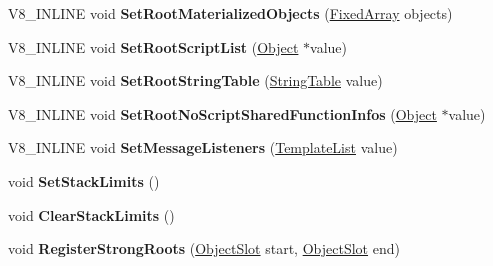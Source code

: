 \begin{DoxyCompactItemize}
V8\+\_\+\+I\+N\+L\+I\+NE void {\bfseries Set\+Root\+Materialized\+Objects} (\mbox{\hyperlink{classv8_1_1internal_1_1FixedArray}{Fixed\+Array}} objects)
\item 
\mbox{\label{classv8_1_1internal_1_1Heap_abf65fbe4afdf1d33782877485794a2c3}} 
V8\+\_\+\+I\+N\+L\+I\+NE void {\bfseries Set\+Root\+Script\+List} (\mbox{\hyperlink{classv8_1_1internal_1_1Object}{Object}} $\ast$value)
\item 
\mbox{\label{classv8_1_1internal_1_1Heap_aee861d7526f931b9e110ca7cde96de02}} 
V8\+\_\+\+I\+N\+L\+I\+NE void {\bfseries Set\+Root\+String\+Table} (\mbox{\hyperlink{classv8_1_1internal_1_1StringTable}{String\+Table}} value)
\item 
\mbox{\label{classv8_1_1internal_1_1Heap_a9a4b125e8b2618a2c705f1e1de66f241}} 
V8\+\_\+\+I\+N\+L\+I\+NE void {\bfseries Set\+Root\+No\+Script\+Shared\+Function\+Infos} (\mbox{\hyperlink{classv8_1_1internal_1_1Object}{Object}} $\ast$value)
\item 
\mbox{\label{classv8_1_1internal_1_1Heap_a63651299b9c5b543702bf1f9439e5061}} 
V8\+\_\+\+I\+N\+L\+I\+NE void {\bfseries Set\+Message\+Listeners} (\mbox{\hyperlink{classv8_1_1internal_1_1TemplateList}{Template\+List}} value)
\item 
\mbox{\label{classv8_1_1internal_1_1Heap_a15c1be5638d9e7858555810ee6745a57}} 
void {\bfseries Set\+Stack\+Limits} ()
\item 
\mbox{\label{classv8_1_1internal_1_1Heap_a50d5de40f97bbb64cce340e67ed85e14}} 
void {\bfseries Clear\+Stack\+Limits} ()
\item 
\mbox{\label{classv8_1_1internal_1_1Heap_a7eea0e36fbe1c96dbfd0cab5af55ca9a}} 
void {\bfseries Register\+Strong\+Roots} (\mbox{\hyperlink{classv8_1_1internal_1_1ObjectSlot}{Object\+Slot}} start, \mbox{\hyperlink{classv8_1_1internal_1_1ObjectSlot}{Object\+Slot}} end)
\item 
\mbox{\label{classv8_1_1internal_1_1Heap_a4a3538bab44cbe5eba463923db5cd69c}} 

\end{DoxyCompactItemize}
